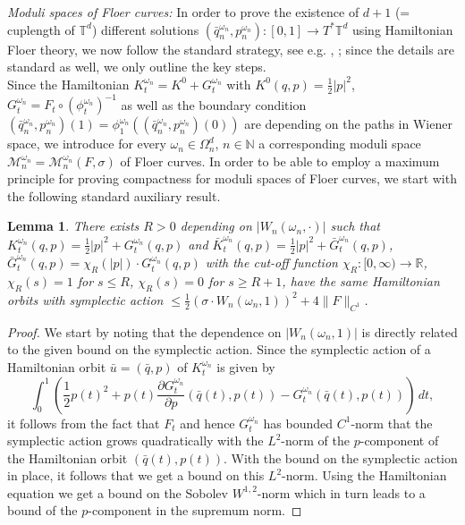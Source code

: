 \documentclass[a4paper,11pt]{amsart}
\newcommand{\NN}{\mathbb{N}}
\newcommand{\RR}{\mathbb{R}}
\newcommand{\TT}{\mathbb{T}}
\newtheorem{lemma}[theorem]{Lemma}
\begin{document}
\noindent\emph{Moduli spaces of Floer curves:} 
In order to prove the existence of $d+1$ (= cuplength of $\TT^d$) different solutions $(\bar{q}_n^{\omega_n},p_n^{\omega_n}):[0,1]\to T^*\TT^d$ using Hamiltonian Floer theory, we now follow the standard strategy, see e.g. \cite{AH}, \cite{Sch}; since the details are standard as well, we only outline the key steps.\\
\indent Since the Hamiltonian $K_t^{\omega_n}=K^0+G_t^{\omega_n}$ with $K^0(q,p)=\frac{1}{2}|p|^2$, $G_t^{\omega_n}=F_t\circ(\phi^{\omega_n}_t)^{-1}$ as well as the boundary condition $(\bar{q}_n^{\omega_n},p_n^{\omega_n})(1)=\phi^{\omega_n}_1((\bar{q}_n^{\omega_n},p_n^{\omega_n})(0))$ are depending on the paths in Wiener space, we introduce for every $\omega_n\in\Omega_n^d$, $n\in\NN$ a corresponding moduli space $\mathcal{M}_n^{\omega_n}=\mathcal{M}_n^{\omega_n}(F,\sigma)$ of Floer curves. In order to be able to employ a maximum principle for proving compactness for moduli spaces of Floer curves, we start with the following standard auxiliary result. 
\begin{lemma}\label{cut-off}
There exists $R>0$ depending on $|W_n(\omega_n,\cdot)|$ such that $K_t^{\omega_n}(q,p)=\frac{1}{2}|p|^2+G_t^{\omega_n}(q,p)$ and $\bar{K}_t^{\omega_n}(q,p)=\frac{1}{2}|p|^2+\bar{G}_t^{\omega_n}(q,p)$, $\bar{G}_t^{\omega_n}(q,p)=\chi_R(|p|)\cdot G_t^{\omega_n}(q,p)$ with the cut-off function $\chi_R:[0,\infty)\to\RR$, $\chi_R(s)=1$ for $s\leq R$, $\chi_R(s)=0$ for $s\geq R+1$, have the same Hamiltonian orbits with symplectic action $\leq \frac{1}{2}(\sigma\cdot W_n(\omega_n,1))^2+4\|F\|_{C^1}$. 
\end{lemma}
\begin{proof}
We start by noting that the dependence on $|W_n(\omega_n,1)|$ is directly related to the given bound on the symplectic action. Since the symplectic action of a Hamiltonian orbit $\bar{u}=(\bar{q},p)$ of $K_t^{\omega_n}$ is given by \[\int_0^1 \left(\frac{1}{2}p(t)^2+p(t)\frac{\partial G_t^{\omega_n}}{\partial p}(\bar{q}(t),p(t))-G_t^{\omega_n}(\bar{q}(t),p(t))\right)\,dt, \] it follows from the fact that $F_t$ and hence $G_t^{\omega_n}$ has bounded $C^1$-norm that the symplectic action grows quadratically with the $L^2$-norm of the $p$-component of the Hamiltonian orbit $(\bar{q}(t),p(t))$. With the bound on the symplectic action in place, it follows that we get a bound on this $L^2$-norm. Using the Hamiltonian equation we get a bound on the Sobolev $W^{1,2}$-norm which in turn leads to a bound of the $p$-component in the supremum norm.      
\end{proof}
\end{document}
